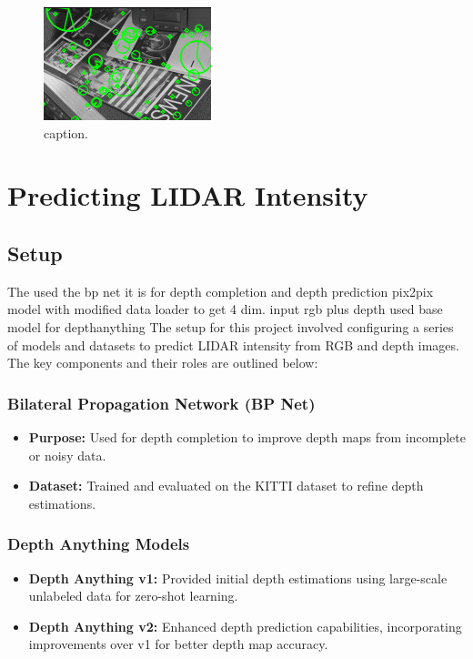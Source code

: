 \begin{figure}[!ht]
	\centering
	\includegraphics[width=0.9\linewidth]{image.jpg}
	\caption{caption.}
	\label{img:example}
\end{figure}
\chapter{Predicting LIDAR Intensity} %
\section{Setup}
The used the bp net it is for depth completion and depth prediction
pix2pix model with modified data loader to get 4 dim. input rgb plus depth
used base model for depthanything
The setup for this project involved configuring a series of models and datasets to predict LIDAR intensity from RGB and depth images. The key components and their roles are outlined below:

\subsection{Bilateral Propagation Network (BP Net)}
\begin{itemize}
	\item \textbf{Purpose:} Used for depth completion to improve depth maps from incomplete or noisy data.
	\item \textbf{Dataset:} Trained and evaluated on the KITTI dataset to refine depth estimations.
\end{itemize}

\subsection{Depth Anything Models}
\begin{itemize}
	\item \textbf{Depth Anything v1:} Provided initial depth estimations using large-scale unlabeled data for zero-shot learning.
	\item \textbf{Depth Anything v2:} Enhanced depth prediction capabilities, incorporating improvements over v1 for better depth map accuracy.
\end{itemize}

